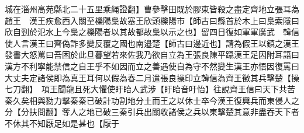 城在淄州高苑縣北二十五里乘䋲證翻】曹參擊田既於膠東皆殺之盡定齊地立張耳為趙王　漢王疾愈西入關至櫟陽梟故塞王欣頭櫟陽市【師古曰縣首於木上曰梟索隱曰欣自剄於氾水上今梟之櫟陽者以其故都故梟以示之也】留四日復如軍軍廣武　韓信使人言漢王曰齊偽詐多變反覆之國也南邉楚【師古曰邊近也】請為假王以鎮之漢王發書大怒罵曰吾困於此旦暮望若來佐我乃欲自立為王張良陳平躡漢王足因附耳語曰漢方不利寧能禁信之自王乎不如因而立之善遇使自為守不然變生漢王亦悟因復罵曰大丈夫定諸侯即為真王耳何以假為春二月遣張良操印立韓信為齊王徵其兵擊楚【操七刀翻】　項王聞龍且死大懼使盱眙人武涉【盱眙音吁怡】往說齊王信曰天下共苦秦久矣相與勠力擊秦秦已破計功割地分土而王之以休士卒今漢王復興兵而東侵人之分【分扶問翻】奪人之地已破三秦引兵出關收諸侯之兵以東擊楚其意非盡吞天下者不休其不知厭足如是甚也【厭于
